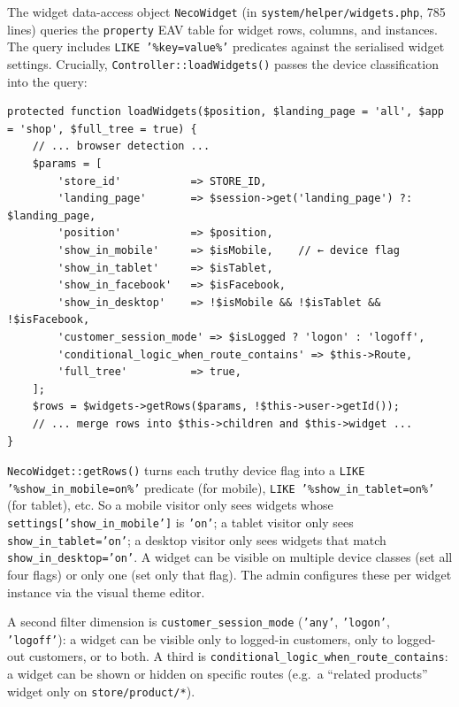 \documentclass[11pt,a4paper]{article}
\begin{document}
The widget data-access object \texttt{NecoWidget} (in
\texttt{system/helper/widgets.php}, 785 lines) queries the
\texttt{property} EAV table for widget rows, columns, and
instances. The query includes \texttt{LIKE '\%key=value\%'}
predicates against the serialised widget settings. Crucially,
\texttt{Controller::loadWidgets()} passes the device
classification into the query:

\begin{lstlisting}[caption={\texttt{Controller::loadWidgets()} --- the device flags passed to \texttt{NecoWidget::getRows()}.},label={lst:mobile-widget-flags}]
protected function loadWidgets($position, $landing_page = 'all', $app = 'shop', $full_tree = true) {
    // ... browser detection ...
    $params = [
        'store_id'           => STORE_ID,
        'landing_page'       => $session->get('landing_page') ?: $landing_page,
        'position'           => $position,
        'show_in_mobile'     => $isMobile,    // ← device flag
        'show_in_tablet'     => $isTablet,
        'show_in_facebook'   => $isFacebook,
        'show_in_desktop'    => !$isMobile && !$isTablet && !$isFacebook,
        'customer_session_mode' => $isLogged ? 'logon' : 'logoff',
        'conditional_logic_when_route_contains' => $this->Route,
        'full_tree'          => true,
    ];
    $rows = $widgets->getRows($params, !$this->user->getId());
    // ... merge rows into $this->children and $this->widget ...
}
\end{lstlisting}

\texttt{NecoWidget::getRows()} turns each truthy device flag into
a \texttt{LIKE '\%show\_in\_mobile=on\%'} predicate (for mobile),
\texttt{LIKE '\%show\_in\_tablet=on\%'} (for tablet), etc. So a
mobile visitor only sees widgets whose
\texttt{settings['show\_in\_mobile']} is \texttt{'on'}; a tablet
visitor only sees \texttt{show\_in\_tablet='on'}; a desktop
visitor only sees widgets that match
\texttt{show\_in\_desktop='on'}. A widget can be visible on
multiple device classes (set all four flags) or only one (set
only that flag). The admin configures these per widget instance
via the visual theme editor.

A second filter dimension is \texttt{customer\_session\_mode}
(\texttt{'any'}, \texttt{'logon'}, \texttt{'logoff'}): a widget
can be visible only to logged-in customers, only to logged-out
customers, or to both. A third is
\texttt{conditional\_logic\_when\_route\_contains}: a widget can
be shown or hidden on specific routes (e.g.\ a ``related
products'' widget only on \texttt{store/product/*}).
\end{document}
